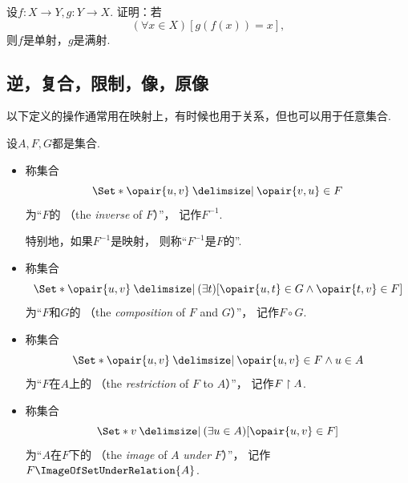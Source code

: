 \begin{example}
设\(f\colon X \to Y,
g\colon Y \to X\).
证明：若\begin{equation*}
	(\forall x \in X)[g(f(x)) = x],
\end{equation*}
则\(f\)是单射，\(g\)是满射.
\end{example}

\subsection{逆，复合，限制，像，原像}
以下定义的操作通常用在映射上，有时候也用于关系，但也可以用于任意集合.
\begin{definition}\label{definition:映射.逆-复合-限制-像}
设\(A,F,G\)都是集合.
\begin{itemize}
	\item 称集合\begin{equation*}
		\Set*{ \opair{u,v} \given \opair{v,u} \in F }
	\end{equation*}为“\(F\)的%
	（the \emph{inverse} of \(F\)）”，
	记作\(F^{-1}\).

	特别地，如果\(F^{-1}\)是映射，
	则称“\(F^{-1}\)是\(F\)的”.

	\item 称集合\begin{equation*}
		\Set*{ \opair{u,v} \given (\exists t)[\opair{u,t} \in G \land \opair{t,v} \in F] }
	\end{equation*}为“\(F\)和\(G\)的%
	（the \emph{composition} of \(F\) and \(G\)）”，
	记作\(F \circ G\).

	\item 称集合\begin{equation*}
		\Set*{ \opair{u,v} \given \opair{u,v} \in F \land u \in A }
	\end{equation*}为“\(F\)在\(A\)上的%
	（the \emph{restriction} of \(F\) to \(A\)）”，
	记作\(F \upharpoonright A\).

	\item 称集合\begin{equation*}
		\Set*{ v \given (\exists u \in A)[\opair{u,v} \in F] }
	\end{equation*}为“\(A\)在\(F\)下的%
	（the \emph{image} of \(A\) \emph{under} \(F\)）”，
	记作\(F\ImageOfSetUnderRelation{A}\).
\end{itemize}
\end{definition}

